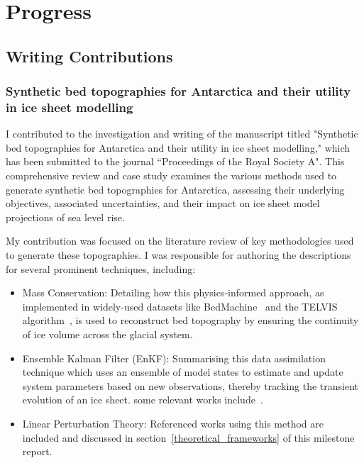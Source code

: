\chapter{Progress}\label{progress}
\section{Writing Contributions}

\subsection{Synthetic bed topographies for Antarctica and their utility in ice sheet modelling}
I contributed to the investigation and writing of the manuscript titled "Synthetic bed topographies for Antarctica and their utility in ice sheet modelling," which has been submitted to the journal ``Proceedings of the Royal Society A". This comprehensive review and case study examines the various methods used to generate synthetic bed topographies for Antarctica, assessing their underlying objectives, associated uncertainties, and their impact on ice sheet model projections of sea level rise.

My contribution was focused on the literature review of key methodologies used to generate these topographies. I was responsible for authoring the descriptions for several prominent techniques, including:
\begin{itemize}
\item{Mass Conservation}: Detailing how this physics-informed approach, as implemented in widely-used datasets like BedMachine~\cite{Morlighem_2020} and the TELVIS algorithm~\cite{TELVIS_2011}, is used to reconstruct bed topography by ensuring the continuity of ice volume across the glacial system.

\item{Ensemble Kalman Filter (EnKF)}: Summarising this data assimilation technique which uses an ensemble of model states to estimate and update system parameters based on new observations, thereby tracking the transient evolution of an ice sheet. some relevant works include~\cite{Gillet-Chaulet_2020, Choi_2025}.

\item{Linear Perturbation Theory}: Referenced works using this method are included and discussed in section~\ref{theoretical_frameworks} of this milestone report.

\end{itemize}

